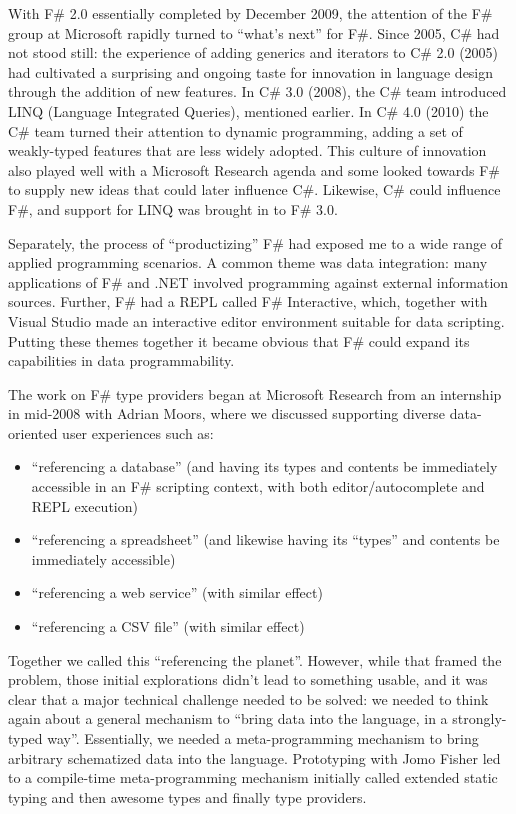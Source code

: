 \documentclass[acmsmall,review]{acmart}\settopmatter{printfolios=true,printccs=false,printacmref=false}
\begin{document}
With F\# 2.0 essentially completed by December 2009, the attention of the F\# group at Microsoft rapidly turned to “what’s next” for F\#. Since 2005, C\# had not stood still: the experience of adding generics and iterators to C\# 2.0 (2005) had cultivated a surprising and ongoing taste for innovation in language design through the addition of new features.  In C\# 3.0 (2008), the C\# team introduced LINQ (Language Integrated Queries), mentioned earlier. In C\# 4.0 (2010) the C\# team turned their attention to dynamic programming, adding a set of weakly-typed features that are less widely adopted. This culture of innovation also played well with a Microsoft Research agenda and some looked towards F\# to supply new ideas that could later influence C\#.  Likewise, C\# could influence F\#, and support for LINQ was brought in to F\# 3.0.

Separately, the process of “productizing” F\# had exposed me to a wide range of applied programming scenarios.  A common theme was data integration: many applications of F\# and .NET involved programming against external information sources.  Further, F\# had a REPL called F\# Interactive, which, together with Visual Studio made an interactive editor environment suitable for data scripting. Putting these themes together it became obvious that F\# could expand its capabilities in data programmability.

The work on F\# type providers began at Microsoft Research from an internship in mid-2008 with Adrian Moors, where we discussed supporting diverse data-oriented user experiences such as:

\begin{itemize}
\item “referencing a database” (and having its types and contents be immediately accessible in an F\# scripting context, with both editor/autocomplete and REPL execution)
\item “referencing a spreadsheet” (and likewise having its “types” and contents be immediately accessible)
\item “referencing a web service” (with similar effect)
\item “referencing a CSV file” (with similar effect)
\end{itemize}

Together we called this “referencing the planet”.  However, while that framed the problem, those initial explorations didn’t lead to something usable, and it was clear that a major technical challenge needed to be solved: we needed to think again about a general mechanism to “bring data into the language, in a strongly-typed way”.  Essentially, we needed a meta-programming mechanism to bring arbitrary schematized data into the language. Prototyping with Jomo Fisher led to a compile-time meta-programming mechanism initially called extended static typing and then awesome types  and finally type providers. 
\end{document}
